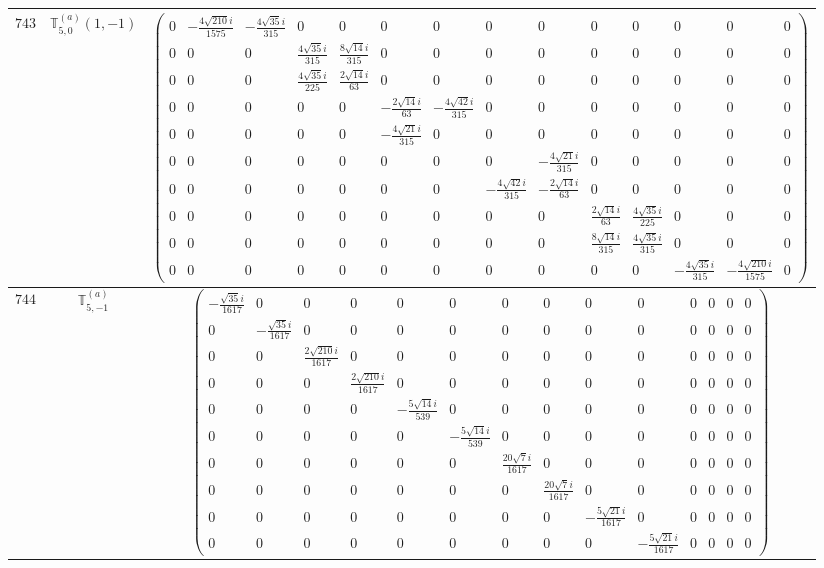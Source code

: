 \documentclass[fleqn,8pt,landscape]{jsarticle}
\begin{document}
\begin{center}
\begin{longtable}{ccc}
$ 743 $ & $ \mathbb{T}_{5,0}^{(a)}(1,-1) $ & $ \begin{pmatrix} 0 & - \frac{4 \sqrt{210} i}{1575} & - \frac{4 \sqrt{35} i}{315} & 0 & 0 & 0 & 0 & 0 & 0 & 0 & 0 & 0 & 0 & 0 \\ 0 & 0 & 0 & \frac{4 \sqrt{35} i}{315} & \frac{8 \sqrt{14} i}{315} & 0 & 0 & 0 & 0 & 0 & 0 & 0 & 0 & 0 \\ 0 & 0 & 0 & \frac{4 \sqrt{35} i}{225} & \frac{2 \sqrt{14} i}{63} & 0 & 0 & 0 & 0 & 0 & 0 & 0 & 0 & 0 \\ 0 & 0 & 0 & 0 & 0 & - \frac{2 \sqrt{14} i}{63} & - \frac{4 \sqrt{42} i}{315} & 0 & 0 & 0 & 0 & 0 & 0 & 0 \\ 0 & 0 & 0 & 0 & 0 & - \frac{4 \sqrt{21} i}{315} & 0 & 0 & 0 & 0 & 0 & 0 & 0 & 0 \\ 0 & 0 & 0 & 0 & 0 & 0 & 0 & 0 & - \frac{4 \sqrt{21} i}{315} & 0 & 0 & 0 & 0 & 0 \\ 0 & 0 & 0 & 0 & 0 & 0 & 0 & - \frac{4 \sqrt{42} i}{315} & - \frac{2 \sqrt{14} i}{63} & 0 & 0 & 0 & 0 & 0 \\ 0 & 0 & 0 & 0 & 0 & 0 & 0 & 0 & 0 & \frac{2 \sqrt{14} i}{63} & \frac{4 \sqrt{35} i}{225} & 0 & 0 & 0 \\ 0 & 0 & 0 & 0 & 0 & 0 & 0 & 0 & 0 & \frac{8 \sqrt{14} i}{315} & \frac{4 \sqrt{35} i}{315} & 0 & 0 & 0 \\ 0 & 0 & 0 & 0 & 0 & 0 & 0 & 0 & 0 & 0 & 0 & - \frac{4 \sqrt{35} i}{315} & - \frac{4 \sqrt{210} i}{1575} & 0 \end{pmatrix} $ \\ \hline
$ 744 $ & $ \mathbb{T}_{5,-1}^{(a)} $ & $ \begin{pmatrix} - \frac{\sqrt{35} i}{1617} & 0 & 0 & 0 & 0 & 0 & 0 & 0 & 0 & 0 & 0 & 0 & 0 & 0 \\ 0 & - \frac{\sqrt{35} i}{1617} & 0 & 0 & 0 & 0 & 0 & 0 & 0 & 0 & 0 & 0 & 0 & 0 \\ 0 & 0 & \frac{2 \sqrt{210} i}{1617} & 0 & 0 & 0 & 0 & 0 & 0 & 0 & 0 & 0 & 0 & 0 \\ 0 & 0 & 0 & \frac{2 \sqrt{210} i}{1617} & 0 & 0 & 0 & 0 & 0 & 0 & 0 & 0 & 0 & 0 \\ 0 & 0 & 0 & 0 & - \frac{5 \sqrt{14} i}{539} & 0 & 0 & 0 & 0 & 0 & 0 & 0 & 0 & 0 \\ 0 & 0 & 0 & 0 & 0 & - \frac{5 \sqrt{14} i}{539} & 0 & 0 & 0 & 0 & 0 & 0 & 0 & 0 \\ 0 & 0 & 0 & 0 & 0 & 0 & \frac{20 \sqrt{7} i}{1617} & 0 & 0 & 0 & 0 & 0 & 0 & 0 \\ 0 & 0 & 0 & 0 & 0 & 0 & 0 & \frac{20 \sqrt{7} i}{1617} & 0 & 0 & 0 & 0 & 0 & 0 \\ 0 & 0 & 0 & 0 & 0 & 0 & 0 & 0 & - \frac{5 \sqrt{21} i}{1617} & 0 & 0 & 0 & 0 & 0 \\ 0 & 0 & 0 & 0 & 0 & 0 & 0 & 0 & 0 & - \frac{5 \sqrt{21} i}{1617} & 0 & 0 & 0 & 0 \end{pmatrix} $ \\ \hline

\end{longtable}
\end{center}
\end{document}
